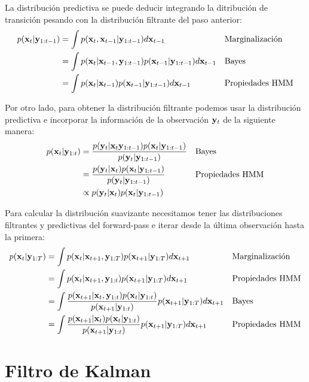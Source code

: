 La distribución predictiva se puede deducir integrando la ditribución de transición pesando con la distribución filtrante del paso anterior:
\begin{align}
    p(\mathbf{x}_t | \mathbf{y}_{1:t-1}) &= \int p(\mathbf{x}_t, \mathbf{x}_{t-1} | \mathbf{y}_{1:t-1}) d\mathbf{x}_{t-1} && \text{Marginalización}\\
    &= \int p(\mathbf{x}_t | \mathbf{x}_{t-1}, \mathbf{y}_{1:t-1}) p(\mathbf{x}_{t-1} | \mathbf{y}_{1:t-1}) d\mathbf{x}_{t-1} && \text{Bayes}\\
    &=\int p(\mathbf{x}_t | \mathbf{x}_{t-1}) p(\mathbf{x}_{t-1} | \mathbf{y}_{1:t-1}) d\mathbf{x}_{t-1} && \text{Propiedades HMM}
\end{align}

Por otro lado, para obtener la distribución filtrante podemos usar la distribución predictiva e incorporar la información de la observación $\mathbf{y}_t$ de la siguiente manera:
\begin{align}
    p(\mathbf{x}_t | \mathbf{y}_{1:t}) &= \frac
            {p(\mathbf{y}_t | \mathbf{x}_t \mathbf{y}_{1:t-1}) p(\mathbf{x}_t | \mathbf{y}_{1:t-1})}
            {p(\mathbf{y}_t | \mathbf{y}_{1:t-1})} && \text{Bayes}\\
    &= \frac{p(\mathbf{y}_t | \mathbf{x}_t) p(\mathbf{x}_t | \mathbf{y}_{1:t-1})}
            {p(\mathbf{y}_t | \mathbf{y}_{1:t-1})} && \text{Propiedades HMM}\\
    &\propto p(\mathbf{y}_t | \mathbf{x}_t) p(\mathbf{x}_t | \mathbf{y}_{1:t-1})
\end{align}

Para calcular la distribución suavizante necesitamos tener las distribuciones filtrantes y predictivas del forward-pass e iterar desde la última observación hasta la primera:
\begin{align}
    p(\mathbf{x}_t | \mathbf{y}_{1:T}) &= 
        \int p(\mathbf{x}_t | \mathbf{x}_{t+1}, \mathbf{y}_{1:T})
             p(\mathbf{x}_{t+1} | \mathbf{y}_{1:T}) d\mathbf{x}_{t+1}
        && \text{Marginalización} \\
    &= \int p(\mathbf{x}_t | \mathbf{x}_{t+1}, \mathbf{y}_{1:t})
             p(\mathbf{x}_{t+1} | \mathbf{y}_{1:T}) d\mathbf{x}_{t+1}
        && \text{Propiedades HMM} \\
    &= \int \frac{p(\mathbf{x}_{t+1} | \mathbf{x}_t, \mathbf{y}_{1:t})p(\mathbf{x}_t |\mathbf{y}_{1:t})}
            {p(\mathbf{x}_{t+1} |\mathbf{y}_{1:t})}
            p(\mathbf{x}_{t+1} | \mathbf{y}_{1:T}) d\mathbf{x}_{t+1}
        && \text{Bayes} \\
    &= \int \frac{p(\mathbf{x}_{t+1} | \mathbf{x}_t)p(\mathbf{x}_t |\mathbf{y}_{1:t})}
            {p(\mathbf{x}_{t+1} |\mathbf{y}_{1:t})}
            p(\mathbf{x}_{t+1} | \mathbf{y}_{1:T}) d\mathbf{x}_{t+1}
        && \text{Propiedades HMM}
\end{align}

\section{Filtro de Kalman}\label{appendix:kf}

